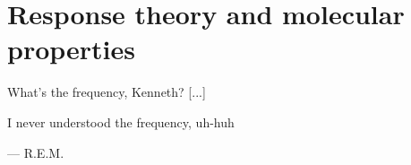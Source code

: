 \chapter{Response theory and molecular properties}\label{ch:molprop}
\epigraph{What's the frequency, Kenneth? [...]

          I never understood the frequency, uh-huh}{
          --- \textsc{R.E.M.}}

